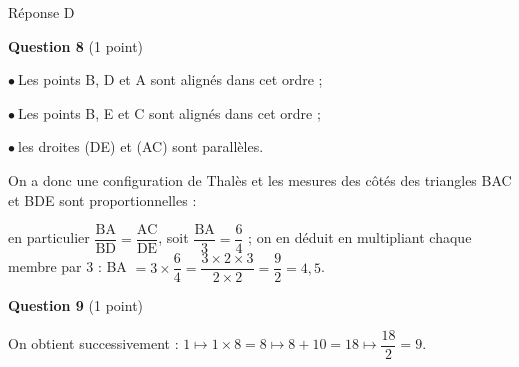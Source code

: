 Réponse D

\medskip

\textbf{Question 8} (1 point)

%
%
$\bullet~$Les points B, D et A sont alignés dans cet ordre ;

$\bullet~$Les points B, E et C sont alignés dans cet ordre ;

$\bullet~$les droites (DE) et (AC) sont parallèles.

On a donc une configuration de Thalès et les mesures des côtés des triangles BAC et BDE sont proportionnelles : 

en particulier $\dfrac{\text{BA}}{\text{BD}} = \dfrac{\text{AC}}{\text{DE}}$, soit 
$\dfrac{\text{BA}}{3} = \dfrac{6}{4}$ ; on en déduit en multipliant chaque membre par 3 : BA $= 3 \times \dfrac64 = \dfrac{3 \times 2 \times 3}{2 \times 2} = \dfrac92 = 4,5$.

\medskip

\textbf{Question 9} (1 point)

On obtient successivement : $1 \longmapsto 1 \times 8 = 8 \longmapsto 8 + 10 = 18 \longmapsto \dfrac{18}{2} = 9$.

%
